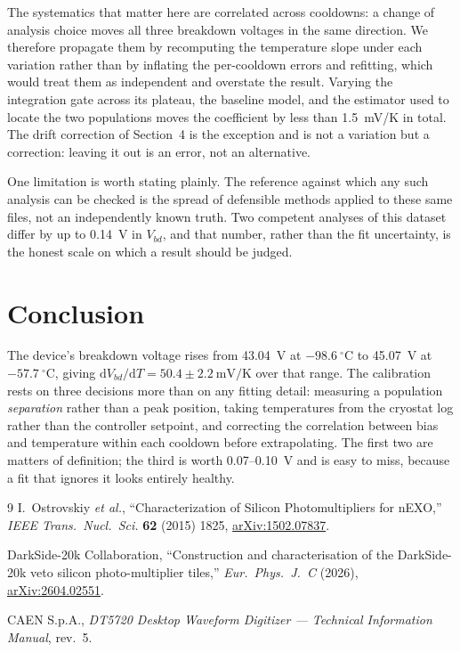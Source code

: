 \documentclass[10pt,twocolumn]{article}
\begin{document}
The systematics that matter here are correlated across cooldowns: a change of
analysis choice moves all three breakdown voltages in the same direction. We
therefore propagate them by recomputing the temperature slope under each
variation rather than by inflating the per-cooldown errors and refitting, which
would treat them as independent and overstate the result. Varying the
integration gate across its plateau, the baseline model, and the estimator used
to locate the two populations moves the coefficient by less than
1.5~mV/K in total. The drift correction of
Section~4 is the exception and is not a variation but a correction: leaving it
out is an error, not an alternative.

One limitation is worth stating plainly. The reference against which any such
analysis can be checked is the spread of defensible methods applied to these
same files, not an independently known truth. Two competent analyses of this
dataset differ by up to 0.14~V in $V_{bd}$, and that number, rather
than the fit uncertainty, is the honest scale on which a result should be
judged.

\section{Conclusion}

The device's breakdown voltage rises from 43.04~V at
$-98.6~^\circ$C to 45.07~V at $-57.7~^\circ$C, giving
$\mathrm{d}V_{bd}/\mathrm{d}T = 50.4 \pm 2.2~\mathrm{mV/K}$ over
that range. The calibration rests on three decisions more than on any fitting
detail: measuring a population \emph{separation} rather than a peak position,
taking temperatures from the cryostat log rather than the controller setpoint,
and correcting the correlation between bias and temperature within each
cooldown before extrapolating. The first two are matters of definition; the
third is worth 0.07--0.10~V and is easy to miss, because a fit
that ignores it looks entirely healthy.

\begin{thebibliography}{9}
\small
{}
I.~Ostrovskiy \textit{et al.},
``Characterization of Silicon Photomultipliers for nEXO,''
\textit{IEEE Trans.\ Nucl.\ Sci.} \textbf{62} (2015) 1825,
\href{https://arxiv.org/abs/1502.07837}{arXiv:1502.07837}.

DarkSide-20k Collaboration,
``Construction and characterisation of the DarkSide-20k veto silicon
photo-multiplier tiles,''
\textit{Eur.\ Phys.\ J.\ C} (2026),
\href{https://arxiv.org/abs/2604.02551}{arXiv:2604.02551}.

CAEN S.p.A., \textit{DT5720 Desktop Waveform Digitizer --- Technical
Information Manual}, rev.~5.

\end{thebibliography}
\end{document}
